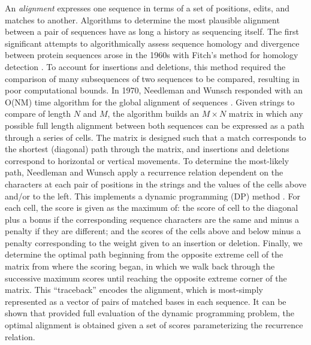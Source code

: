 \documentclass[a4paper,12pt,numbered,oneside]{Classes/PhDThesisPSnPDF}
\begin{document}
An \emph{alignment} expresses one sequence in terms of a set of positions, edits, and matches to another.
Algorithms to determine the most plausible alignment between a pair of sequences have as long a history as sequencing itself.
The first significant attempts to algorithmically assess sequence homology and divergence between protein sequences arose in the 1960s with Fitch's method for homology detection \cite{fitch1966improved}.
To account for insertions and deletions, this method required the comparison of many subsequences of two sequences to be compared, resulting in poor computational bounds.
In 1970, Needleman and Wunsch responded with an O(NM) time algorithm for the global alignment of sequences \cite{needleman1970general}.
Given strings to compare of length $N$ and $M$, the algorithm builds an $M \times N$ matrix in which any possible full length alignment between both sequences can be expressed as a path through a series of cells.
The matrix is designed such that a match corresponds to the shortest (diagonal) path through the matrix, and insertions and deletions correspond to horizontal or vertical movements.
To determine the most-likely path, Needleman and Wunsch apply a recurrence relation dependent on the characters at each pair of positions in the strings and the values of the cells above and/or to the left.
This implements a dynamic programming (DP) method \cite{bellman1952theory}.
For each cell, the score is given as the maximum of: the score of cell to the diagonal plus a bonus if the corresponding sequence characters are the same and minus a penalty if they are different; and the scores of the cells above and below minus a penalty corresponding to the weight given to an insertion or deletion.
Finally, we determine the optimal path beginning from the opposite extreme cell of the matrix from where the scoring began, in which we walk back through the successive maximum scores until reaching the opposite extreme corner of the matrix.
This ``traceback'' encodes the alignment, which is most-simply represented as a vector of pairs of matched bases in each sequence.
It can be shown that provided full evaluation of the dynamic programming problem, the optimal alignment is obtained given a set of scores parameterizing the recurrence relation.
\end{document}
